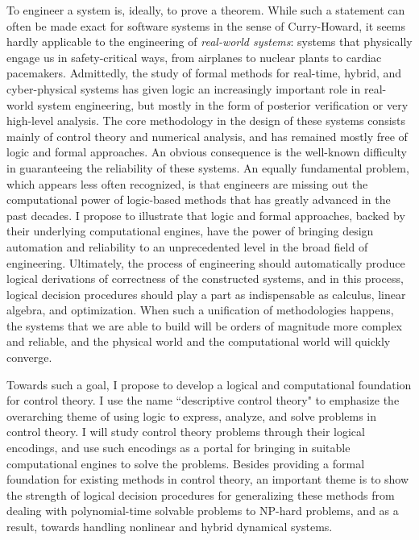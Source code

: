 \documentclass[10pt]{article}
\theoremstyle{definition}
\begin{document}
To engineer a system is, ideally, to prove a theorem. While such a statement can often be made exact for software systems in the sense of Curry-Howard, it seems hardly applicable to the engineering of {\em real-world systems}: systems that physically engage us in safety-critical ways, from airplanes to nuclear plants to cardiac pacemakers. Admittedly, the study of formal methods for real-time, hybrid, and cyber-physical systems has given logic an increasingly important role in real-world system engineering, but mostly in the form of posterior verification or very high-level analysis. The core methodology in the design of these systems consists mainly of control theory and numerical analysis, and has remained mostly free of logic and formal approaches. An obvious consequence is the well-known difficulty in guaranteeing the reliability of these systems. An equally fundamental problem, which appears less often recognized, is that engineers are missing out the computational power of logic-based methods that has greatly advanced in the past decades. I propose to illustrate that logic and formal approaches, backed by their underlying computational engines, have the power of bringing design automation and reliability to an unprecedented level in the broad field of engineering. Ultimately, the process of engineering should automatically produce logical derivations of correctness of the constructed systems, and in this process, logical decision procedures should play a part as indispensable as calculus, linear algebra, and optimization. When such a unification of methodologies happens, the systems that we are able to build will be orders of magnitude more complex and reliable, and the physical world and the computational world will quickly converge. 

Towards such a goal, I propose to develop a logical and computational foundation for control theory. I use the name ``descriptive control theory" to emphasize the overarching theme of using logic to express, analyze, and solve problems in control theory. I will study control theory problems through their logical encodings, and use such encodings as a portal for bringing in suitable computational engines to solve the problems. Besides providing a formal foundation for existing methods in control theory, an important theme is to show the strength of logical decision procedures for generalizing these methods from dealing with polynomial-time solvable problems to NP-hard problems, and as a result, towards handling nonlinear and hybrid dynamical systems. 
 
\end{document}
